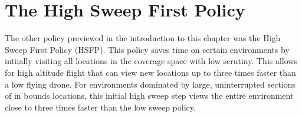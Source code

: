 \section{The High Sweep First Policy}

The other policy previewed in the introduction to this chapter was the High Sweep First Policy (HSFP). This policy saves time on certain environments by intiially visiting all locations in the coverage space with low scrutiny. This allows for high altitude flight that can view new locations up to three times faster than a low flying drone. For environments dominated by large, uninterrupted sections of in bounds locations, this initial high sweep step views the entire environment close to three times faster than the low sweep policy. 